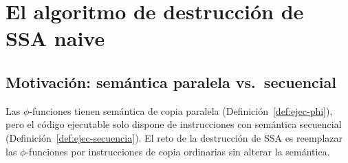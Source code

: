 \documentclass[12pt, a4paper]{article}
\begin{document}
\section{El algoritmo de destrucción de SSA naive}

\subsection{Motivación: semántica paralela vs.\ secuencial}

Las $\phi$-funciones tienen semántica de copia paralela (Definición~\ref{def:ejec-phi}), pero
el código ejecutable solo dispone de instrucciones con semántica secuencial
(Definición~\ref{def:ejec-secuencia}). El reto de la destrucción de SSA es reemplazar las
$\phi$-funciones por instrucciones de copia ordinarias sin alterar la semántica.
\end{document}
